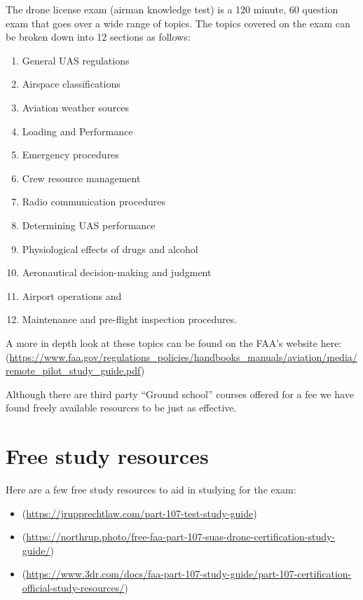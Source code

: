 \documentclass[
]{book}
\providecommand{\tightlist}{%
  \setlength{\itemsep}{0pt}\setlength{\parskip}{0pt}}
\begin{document}
The drone license exam (airman knowledge test) is a 120 minute, 60 question exam that goes over a wide range of topics. The topics covered on the exam can be broken down into 12 sections as follows:

\begin{enumerate}
\def\labelenumi{\arabic{enumi}.}
\tightlist
\item
  General UAS regulations
\item
  Airspace classifications
\item
  Aviation weather sources
\item
  Loading and Performance
\item
  Emergency procedures
\item
  Crew resource management
\item
  Radio communication procedures
\item
  Determining UAS performance
\item
  Physiological effects of drugs and alcohol
\item
  Aeronautical decision-making and judgment
\item
  Airport operations
  and
\item
  Maintenance and pre-flight inspection procedures.
\end{enumerate}

A more in depth look at these topics can be found on the FAA's website here: (\url{https://www.faa.gov/regulations_policies/handbooks_manuals/aviation/media/remote_pilot_study_guide.pdf})

Although there are third party ``Ground school'' courses offered for a fee we have found freely available resources to be just as effective.

\hypertarget{free-study-resources}{%
\section{Free study resources}\label{free-study-resources}}

Here are a few free study resources to aid in studying for the exam:

\begin{itemize}
\tightlist
\item
  (\url{https://jrupprechtlaw.com/part-107-test-study-guide})
\item
  (\url{https://northrup.photo/free-faa-part-107-suas-drone-certification-study-guide/})
\item
  (\url{https://www.3dr.com/docs/faa-part-107-study-guide/part-107-certification-official-study-resources/})
\end{itemize}
\end{document}
